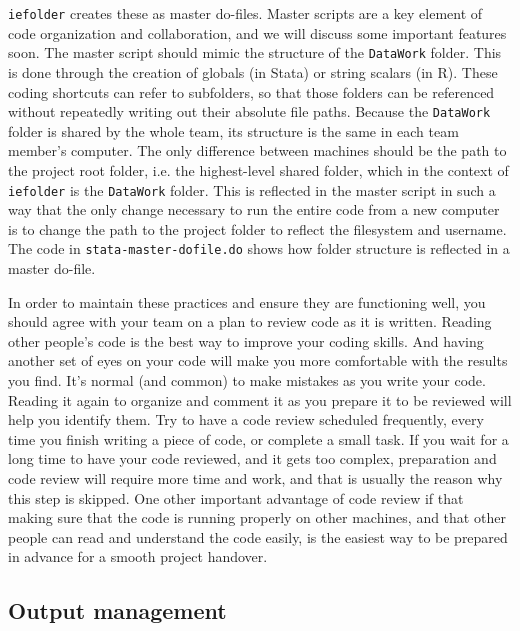 \texttt{iefolder} creates these as master do-files.
Master scripts are a key element of code organization and collaboration,
and we will discuss some important features soon.
The master script should mimic the structure of the \texttt{DataWork} folder.
This is done through the creation of globals (in Stata) or string scalars (in R).
These coding shortcuts can refer to subfolders,
so that those folders can be referenced without repeatedly writing out their absolute file paths.
Because the \texttt{DataWork} folder is shared by the whole team,
its structure is the same in each team member's computer.
The only difference between machines should be
the path to the project root folder, i.e. the highest-level shared folder, which in the context of \texttt{iefolder} is the \texttt{DataWork} folder.
This is reflected in the master script in such a way that
the only change necessary to run the entire code from a new computer
is to change the path to the project folder to reflect the filesystem and username.
The code in \texttt{stata-master-dofile.do} shows how folder structure is reflected in a master do-file.

In order to maintain these practices and ensure they are functioning well,
you should agree with your team on a plan to review code as it is written.
Reading other people's code is the best way to improve your coding skills.
And having another set of eyes on your code will make you more comfortable with the results you find.
It's normal (and common) to make mistakes as you write your code.
Reading it again to organize and comment it as you prepare it to be reviewed will help you identify them.
Try to have a code review scheduled frequently,
every time you finish writing a piece of code, or complete a small task.
If you wait for a long time to have your code reviewed, and it gets too complex,
preparation and code review will require more time and work,
and that is usually the reason why this step is skipped.
One other important advantage of code review if that 
making sure that the code is running properly on other machines,
and that other people can read and understand the code easily,
is the easiest way to be prepared in advance for a smooth project handover.

\subsection{Output management}

